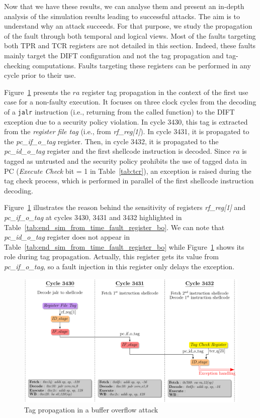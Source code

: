 Now that we have these results, we can analyse them and present an in-depth analysis of the simulation results leading to successful attacks. The aim is to understand why an attack succeeds. For that purpose, we study the propagation of the fault through both temporal and logical views. Most of the faults targeting both TPR and TCR registers are not detailed in this section. Indeed, these faults mainly target the DIFT configuration and not the tag propagation and tag-checking computations. Faults targeting these registers can be performed in any cycle prior to their use. 

Figure~\ref{fig:study_buffer_overflow_tag_propagation} presents the $ra$ register tag propagation in the context of the first use case for a non-faulty execution. It focuses on three clock cycles from the decoding of a \verb|jalr| instruction (i.e.,  returning from the called function) to the DIFT exception due to a security policy violation. 
In cycle 3430, this tag is extracted from the \textit{register file tag} (i.e., from \textit{rf\_reg[1]}). In cycle 3431, it is propagated to the \textit{pc\_if\_o\_tag} register. Then, in cycle 3432, it is propagated to the \textit{pc\_id\_o\_tag} register and the first shellcode instruction is decoded. Since $ra$ is tagged as untrusted and the security policy prohibits the use of tagged data in PC (\textit{Execute Check} bit = 1 in Table~\ref{tab:tcr}), an exception is raised during the tag check process, which is performed in parallel of the first shellcode instruction decoding.

Figure~\ref{fig:study_buffer_overflow_tag_propagation} illustrates the reason behind the sensitivity of registers \textit{rf\_reg[1]} and \textit{pc\_if\_o\_tag} at cycles 3430, 3431 and 3432 highlighted in  Table~\ref{tab:end_sim_from_time_fault_register_bo}. We can note that \textit{pc\_id\_o\_tag} register does not appear in Table~\ref{tab:end_sim_from_time_fault_register_bo} while Figure~\ref{fig:study_buffer_overflow_tag_propagation} shows its role during tag propagation. Actually, this register gets its value from \textit{pc\_if\_o\_tag}, so a fault injection in this register only delays the exception. 

\begin{figure}[ht]
    \centering
    \includegraphics[width=\textwidth]{c3_vulnerabilities_assessment/img/buffer_overflow/bufferOverflowAttack_short.pdf}
    \caption{Tag propagation in a buffer overflow attack}
    \label{fig:study_buffer_overflow_tag_propagation}
\end{figure}

